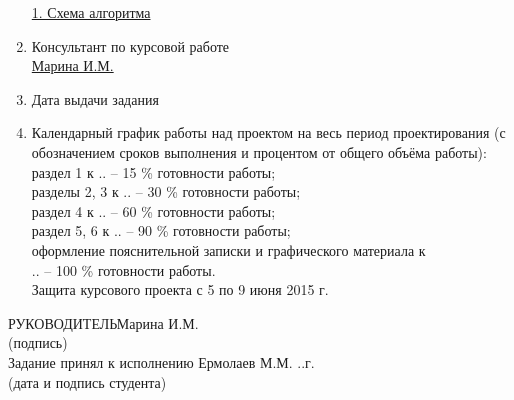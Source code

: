\documentclass[14pt,a4paper]{extreport}
\begin{document}
\begin{enumerate}
	\underline{1. Схема алгоритма}
	\item Консультант по курсовой работе\\
	\underline{Марина И.М.}
	\item Дата выдачи задания \underline{}
	\item Календарный график работы над проектом на весь период проектирования (с обозначением сроков выполнения и процентом от общего объёма работы):\\
	\underline{\hspace*{16cm}}\hspace*{-16cm}раздел 1 к .. – 15 \% готовности работы;\\
	\underline{\hspace*{16cm}}\hspace*{-16cm}разделы 2, 3 к .. – 30 \% готовности работы;\\
	\underline{\hspace*{16cm}}\hspace*{-16cm}раздел 4 к .. – 60 \% готовности работы;\\
	\underline{\hspace*{16cm}}\hspace*{-16cm}раздел 5, 6 к ..  –  90 \% готовности работы;\\
	\underline{\hspace*{16cm}}\hspace*{-16cm}оформление пояснительной записки и графического материала к\\
	\underline{\hspace*{16cm}}\hspace*{-16cm}.. – 100 \% готовности работы.\\
	\underline{\hspace*{16cm}}\hspace*{-16cm}Защита курсового проекта с 5  по 9 июня 2015 г.\\
	\end{enumerate}
	\hspace*{7cm}РУКОВОДИТЕЛЬ\underline{\hspace*{6cm}}\hspace*{-3.9cm}Марина И.М.\\
	\hspace*{11.5cm}\small (подпись) \normalsize\\
	\bigskip
	Задание принял к исполнению \underline{\hspace*{10.5cm}}\hspace*{-8cm}Ермолаев М.М. ..г.\\
	\hspace*{7cm}\small (дата и подпись студента) \normalsize\\
	\newpage
	\pagestyle{plain}
	
\end{document}
